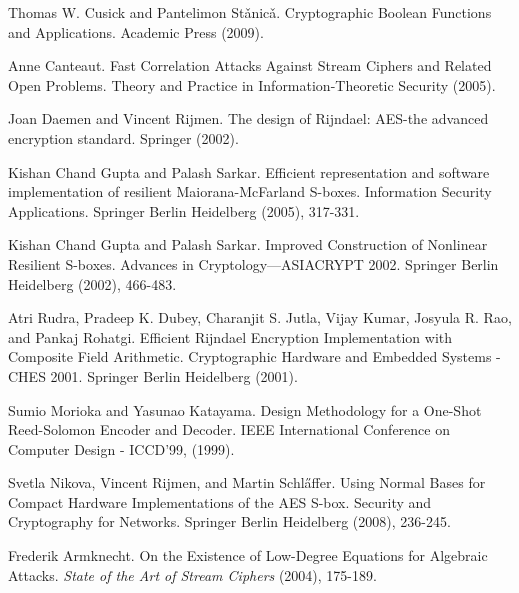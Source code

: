 \documentclass[11pt]{article}
\begin{document}
\begin{thebibliography}{9}
 Thomas W. Cusick and Pantelimon St\v{a}nic\v{a}. Cryptographic Boolean Functions and Applications. 
Academic Press (2009).

 Anne Canteaut. Fast Correlation Attacks Against Stream Ciphers and Related Open Problems. 
Theory and Practice in Information-Theoretic Security (2005).

 Joan Daemen and Vincent Rijmen. The design of Rijndael: AES-the advanced encryption standard. Springer (2002).

 Kishan Chand Gupta and Palash Sarkar. Efficient representation and software implementation of resilient Maiorana-McFarland S-boxes. Information Security Applications. Springer Berlin Heidelberg (2005), 317-331.

 Kishan Chand Gupta and Palash Sarkar. Improved Construction of Nonlinear Resilient S-boxes. Advances in Cryptology—ASIACRYPT 2002. Springer Berlin Heidelberg (2002), 466-483.

 Atri Rudra, Pradeep K. Dubey, Charanjit S. Jutla, Vijay Kumar, Josyula R. Rao, and Pankaj Rohatgi. Efficient Rijndael Encryption Implementation with Composite Field Arithmetic. Cryptographic Hardware and Embedded Systems - CHES 2001. Springer Berlin Heidelberg (2001).

 Sumio Morioka and Yasunao Katayama. Design Methodology for a One-Shot Reed-Solomon Encoder and Decoder. IEEE International Conference on Computer Design - ICCD'99, (1999).

 Svetla Nikova, Vincent Rijmen, and Martin Schl\H{a}ffer. Using Normal Bases for Compact Hardware Implementations of the AES S-box. Security and Cryptography for Networks. Springer Berlin Heidelberg (2008), 236-245.

 Frederik Armknecht. On the Existence of Low-Degree Equations for Algebraic Attacks. \emph{State of the Art of Stream Ciphers} (2004), 175-189.

\end{thebibliography}
\end{document}
